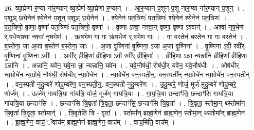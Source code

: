 \documentclass[17pt]{extarticle}
\begin{document}
26. व्या॒घ्रेणा॑ र॒ण्या ना॑र॒ण्यान् व्या॒घ्रेण॑ व्या॒घ्रेणा॑ र॒ण्यान् । . आ॒र॒ण्यान् प॒शून् प॒शू ना॑र॒ण्या ना॑र॒ण्यान् प॒शून् । . प॒शूञ् छ्ये॒नेन॑ श्ये॒नेन॑ प॒शून् प॒शूञ् छ्ये॒नेन॑ । . श्ये॒नेन॑ पत॒त्रिणः॑ पत॒त्रिणः॑ श्ये॒नेन॑ श्ये॒नेन॑ पत॒त्रिणः॑ । . प॒त॒त्रिणो॒ वृष्णा॒ वृष्णा॑ पत॒त्रिणः॑ पत॒त्रिणो॒ वृष्णा᳚ । . वृष्णा ऽश्वा॒ नश्वा॒न् वृष्णा॒ वृष्णा ऽश्वान्॑ । . अश्वा॑ नृष॒भेण॑ र्.ष॒भेणाश्वा॒ नश्वा॑ नृष॒भेण॑ । . ऋ॒ष॒भेण॒ गा गा ऋ॑ष॒भेण॑ र्.ष॒भेण॒ गाः । . गा ब॒स्तेन॑ ब॒स्तेन॒ गा गा ब॒स्तेन॑ । . ब॒स्तेना॒ जा अ॒जा ब॒स्तेन॑ ब॒स्तेना॒ जाः । . अ॒जा वृ॒ष्णिना॑ वृ॒ष्णिना॒ ऽजा अ॒जा वृ॒ष्णिना᳚ । . वृ॒ष्णिना ऽवी॒ रवी᳚र् वृ॒ष्णिना॑ वृ॒ष्णिना ऽवीः᳚ । . अवी᳚र् व्री॒हिणा᳚ व्री॒हिणा ऽवी॒ रवी᳚र् व्री॒हिणा᳚ । . व्री॒हिणा ऽन्ना॒ न्यन्ना॑नि व्री॒हिणा᳚ व्री॒हिणा ऽन्ना॑नि । . अन्ना॑नि॒ यवे॑न॒ यवे॒ना न्ना॒ न्यन्ना॑नि॒ यवे॑न । . यवे॒नौष॑धी॒ रोष॑धी॒र् यवे॑न॒ यवे॒नौष॑धीः । . ओष॑धीर् न्य॒ग्रोधे॑न न्य॒ग्रोधे॒ नौष॑धी॒ रोष॑धीर् न्य॒ग्रोधे॑न । . न्य॒ग्रोधे॑न॒ वन॒स्पती॒न्॒. वन॒स्पती᳚न् न्य॒ग्रोधे॑न न्य॒ग्रोधे॑न॒ वन॒स्पतीन्॑ । . वन॒स्पती॑ नुदु॒म्बरे॑ णोदु॒म्बरे॑ण॒ वन॒स्पती॒न्॒. वन॒स्पती॑ नुदु॒म्बरे॑ण । . उ॒दु॒म्बरे॒ णोर्ज॒ मूर्ज॑ मुदु॒म्बरे॑ णोदु॒म्बरे॒ णोर्ज᳚म् । . ऊर्ज॑म् गायत्रि॒या गा॑यत्रि॒ योर्ज॒ मूर्ज॑म् गायत्रि॒या । . गा॒य॒त्रि॒या छन्दाꣳ॑सि॒ छन्दाꣳ॑सि गायत्रि॒या गा॑यत्रि॒या छन्दाꣳ॑सि । . छन्दाꣳ॑सि त्रि॒वृता᳚ त्रि॒वृता॒ छन्दाꣳ॑सि॒ छन्दाꣳ॑सि त्रि॒वृता᳚ । . त्रि॒वृता॒ स्तोमा॒न् थ्स्तोमा᳚न् त्रि॒वृता᳚ त्रि॒वृता॒ स्तोमान्॑ । . त्रि॒वृतेति॑ त्रि - वृता᳚ । . स्तोमा᳚न् ब्राह्म॒णेन॑ ब्राह्म॒णेन॒ स्तोमा॒न् थ्स्तोमा᳚न् ब्राह्म॒णेन॑ । . ब्रा॒ह्म॒णेन॒ वाचं॒ ॅवाच॑म् ब्राह्म॒णेन॑ ब्राह्म॒णेन॒ वाच᳚म् । . वाच॒मिति॒ वाच᳚म् । \newline
\end{document}
